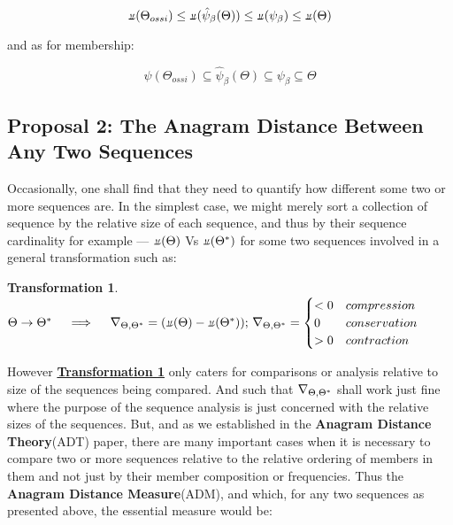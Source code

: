 \documentclass[11pt,a4paper]{article}
\newtheorem{trans}{Transformation}
\newcommand{\invpi}[1]{\mathop{\rotatebox[origin=c]{180}{$\pi$}}#1}
\newcommand{\invdel}[1]{\mathop{\rotatebox[origin=c]{180}{$\Delta$}}#1}
\begin{document}
\begin{equation}
\invpi(\Theta_{ossi}) \leq  \invpi(\hat{\psi}_\beta(\Theta)) \leq \invpi(\psi_\beta) \leq  \invpi(\Theta)
\end{equation}

and as for membership:


\begin{equation}
\psi(\Theta_{ossi}) \subseteq  \hat{\psi}_\beta(\Theta) \subseteq \psi_\beta \subseteq  \Theta
\end{equation}


\subsection{Proposal 2: The Anagram Distance Between Any Two Sequences\cite{adtpaper}}

Occasionally, one shall find that they need to quantify how different some two or more sequences are. In the simplest case, we might merely sort a collection of sequence by the relative size of each sequence, and thus by their sequence cardinality for example --- $\invpi(\Theta)$ Vs $\invpi(\Theta^*)$ for some two sequences involved in a general transformation such as:\\

\begin{trans}
\label{TRANS1}
$\Theta \rightarrow \Theta^* \quad \implies \quad \invdel_{\Theta,\Theta^*} = (\invpi(\Theta) - \invpi(\Theta^*));\\
\invdel_{\Theta,\Theta^*} = \begin{cases}
< 0 & compression\\
 0 & conservation\\
 > 0 & contraction
 \end{cases}
$
\end{trans}

However \textbf{\hyperref[TRANS1]{Transformation \ref{TRANS1}}} only caters for comparisons or analysis relative to size of the sequences being compared. And such that $\invdel_{\Theta,\Theta^*}$ shall work just fine where the purpose of the sequence analysis is just concerned with the relative sizes of the sequences. But, and as we established in the \textbf{Anagram Distance Theory}(ADT) paper\cite{adtpaper}, there are many important cases when it is necessary to compare two or more sequences relative to the relative ordering of members in them and not just by their member composition or frequencies. Thus the \textbf{Anagram Distance Measure}(ADM), and which, for any two sequences as presented above, the essential measure would be:
\end{document}
